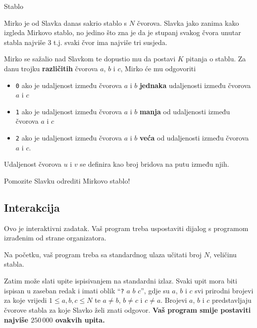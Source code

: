 \begin{statement}[
  problempoints=100,
  timelimit=3 sekundi,
  memorylimit=512 MiB,
]{Stablo}\

Mirko je od Slavka danas sakrio stablo s $N$ čvorova. Slavka jako zanima kako izgleda Mirkovo stablo, no jedino što zna je da je stupanj svakog čvora unutar stabla najviše $3$ t.j. svaki čvor ima najviše tri susjeda.

Mirko se sažalio nad Slavkom te dopustio mu da postavi $K$ pitanja o stablu. Za danu trojku \textbf{različitih} čvorova $a$, $b$ i $c$, Mirko će mu odgovoriti
\vspace{-1em}

\begin{itemize}
\item \texttt{0} ako je udaljenost između čvorova $a$ i $b$ \textbf{jednaka} udaljenosti između čvorova $a$ i $c$
\vspace{-0.2em}
\item \texttt{1} ako je udaljenost između čvorova $a$ i $b$ \textbf{manja} od udaljenosti između čvorova $a$ i $c$
\vspace{-0.2em}
\item \texttt{2} ako je udaljenost između čvorova $a$ i $b$ \textbf{veća} od udaljenosti između čvorova $a$ i $c$.
\end{itemize}

\vspace{-0.8em}
Udaljenost čvorova $u$ i $v$ se definira kao broj bridova na putu između njih.
\vspace{-0.2em}

Pomozite Slavku odrediti Mirkovo stablo!

\subsection*{Interakcija}

Ovo je interaktivni zadatak. Vaš program treba uspostaviti dijalog s programom izrađenim od strane organizatora.

Na početku, vaš program treba sa standardnog ulaza učitati broj $N$, veličinu stabla.

Zatim može slati upite ispisivanjem na standardni izlaz. Svaki upit mora biti ispisan u zaseban redak i imati oblik ``\texttt{?} $a$ $b$ $c$'', gdje su $a$, $b$ i $c$ svi prirodni brojevi za koje vrijedi $1 \le a, b, c \le N$ te $a \neq b$, $b \neq c$ i $c \neq a$. Brojevi $a$, $b$ i $c$ predstavljaju čvorove stabla za koje Slavko želi znati odgovor. \textbf{Vaš program smije postaviti najviše $250\,000$ ovakvih upita.}


\end{statement}
